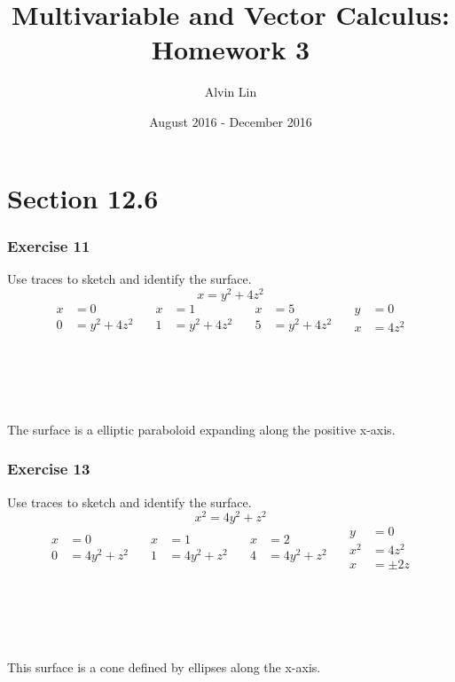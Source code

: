 \documentclass[letterpaper, 12pt]{math}
\title{Multivariable and Vector Calculus: Homework 3}
\author{Alvin Lin}
\date{August 2016 - December 2016}
\begin{document}
\maketitle

\section*{Section 12.6}

\subsubsection*{Exercise 11}
Use traces to sketch and identify the surface.
\[ x = y^2+4z^2 \]
\[\begin{split}
  x &= 0 \\
  0 &= y^2+4z^2
\end{split}\quad
\begin{split}
  x &= 1 \\
  1 &= y^2+4z^2
\end{split}\quad
\begin{split}
  x &= 5 \\
  5 &= y^2+4z^2
\end{split}\quad
\begin{split}
  y &= 0 \\
  x &= 4z^2
\end{split} \]
\\ \\ \\ \\ \\
The surface is a elliptic paraboloid expanding along the positive x-axis.

\subsubsection*{Exercise 13}
Use traces to sketch and identify the surface.
\[ x^2 = 4y^2+z^2 \]
\[\begin{split}
  x &= 0 \\
  0 &= 4y^2+z^2
\end{split}\quad
\begin{split}
  x &= 1 \\
  1 &= 4y^2+z^2
\end{split}\quad
\begin{split}
  x &= 2 \\
  4 &= 4y^2+z^2
\end{split}\quad
\begin{split}
  y &= 0 \\
  x^2 &= 4z^2 \\
  x &= \pm2z
\end{split} \]
\\ \\ \\ \\ \\
This surface is a cone defined by ellipses along the x-axis.
\end{document}
